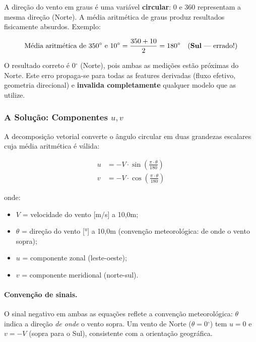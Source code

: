 \documentclass[12pt, a4paper]{article}
\begin{document}
A direção do vento em graus é uma variável \textbf{circular}: 0\textdegree{} e 360\textdegree{}
representam a mesma direção (Norte). A média aritmética de graus produz
resultados fisicamente absurdos. Exemplo:

\begin{equation*}
    \text{Média aritmética de } 350{^\circ} \text{ e } 10{^\circ} =
    \frac{350 + 10}{2} = 180{^\circ} \quad \text{(\textbf{Sul} --- errado!)}
\end{equation*}

O resultado correto é $0{^\circ}$ (Norte), pois ambas as medições estão próximas
do Norte. Este erro propaga-se para todas as features derivadas (fluxo
efetivo, geometria direcional) e \textbf{invalida completamente} qualquer
modelo que as utilize.

\subsubsection{A Solução: Componentes $u, v$}

A decomposição vetorial converte o ângulo circular em duas grandezas
escalares cuja média aritmética é válida:

\begin{align}
    u &= -V \cdot \sin\!\left(\frac{\pi \cdot \theta}{180}\right)
    \label{eq:u_component} \\[6pt]
    v &= -V \cdot \cos\!\left(\frac{\pi \cdot \theta}{180}\right)
    \label{eq:v_component}
\end{align}

onde:
\begin{itemize}[noitemsep]
    \item $V$ = velocidade do vento [\si{\metre/\second}] a 10,0m;
    \item $\theta$ = direção do vento [\si{\degree}] a 10,0m (convenção
          meteorológica: de onde o vento sopra);
    \item $u$ = componente zonal (leste-oeste);
    \item $v$ = componente meridional (norte-sul).
\end{itemize}

\paragraph{Convenção de sinais.} O sinal negativo em ambas as equações
reflete a convenção meteorológica: $\theta$ indica a direção \textit{de
onde} o vento sopra. Um vento de Norte ($\theta = 0{^\circ}$) tem $u = 0$ e
$v = -V$ (sopra para o Sul), consistente com a orientação geográfica.
\end{document}
